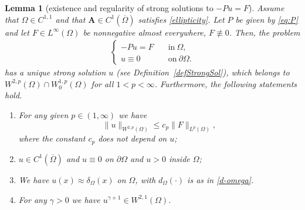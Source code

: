 \documentclass[12pt,a4paper]{amsart}
\newtheorem{lemma}[theorem]{\bf Lemma}
\theoremstyle{definition}
\newcommand{\A}{\mathbf{A}}
\begin{document}
\begin{lemma}[existence and regularity of strong solutions to $-Pu=F$] \label{lemm:KPR_assumption_verification}
    Assume that $\Omega \in C^{1,1}$ and that $\A\in C^{1}(\overline{\Omega})$ satisfies \eqref{ellipticity}. Let $P$ be given by \eqref{eq:P} and let $F\in L^\infty(\Omega)$ be nonnegative almost everywhere,  $F\not\equiv 0$. Then, the problem 
    \begin{align*}
        \begin{cases} -Pu = F\quad &\text{in}\ \Omega,\\
            u \equiv 0\quad &\text{on}\ \partial \Omega.
        \end{cases}
    \end{align*}
    has a unique strong solution $u$ (see Definition~\ref{defStrongSol}), which belongs to $W^{2,p}(\Omega)\cap W^{1,p}_0(\Omega)$ for all $1<p<\infty$. 
    Furthermore, the following statements hold. 
\begin{enumerate}[label={\bf \textup{(\alph*)}}]\label{el-reg} 
        \item \label{lemm:KPR_assumption_verification_i} For any given $p\in (1,\infty)$ we have
        \begin{equation}\label{cald-zyg}
        \| u\|_{W^{2,p}(\Omega)}\le c_p \| F\|_{L^p(\Omega)},    
        \end{equation}
        where the constant $c_p$ does not depend on $u$;
        \item \label{lemm:KPR_assumption_verification_ii} $u\in C^1 (\overline{\Omega})$ and $u\equiv 0$ on $\partial\Omega$ and $u>0$ inside $\Omega$;
        \item \label{lemm:KPR_assumption_verification_iv} We have $u(x) \approx \delta_\Omega(x)$ on $\Omega$, with $d_\Omega (\cdot)$ is as in \eqref{d-omega}.
        \item \label{lemm:KPR_assumption_verification_iii}  For any $\gamma>0$ we have $u^{\gamma+1}\in W^{2,1}(\Omega)$.
        \end{enumerate}
\end{lemma}
\end{document}
